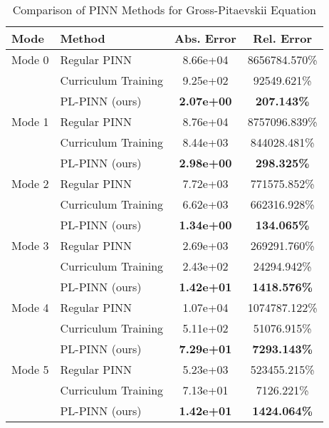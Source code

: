 \begin{table}[htbp]
\centering
\caption{Comparison of PINN Methods for Gross-Pitaevskii Equation}
\label{tab:pinn_comparison}
\begin{tabular}{llcc}
\toprule
Mode & Method & Abs. Error & Rel. Error \\
\midrule
Mode 0 & Regular PINN & 8.66e+04 & 8656784.570\% \\
 & Curriculum Training & 9.25e+02 & 92549.621\% \\
 & PL-PINN (ours) & \textbf{2.07e+00} & \textbf{207.143\%} \\
\midrule
Mode 1 & Regular PINN & 8.76e+04 & 8757096.839\% \\
 & Curriculum Training & 8.44e+03 & 844028.481\% \\
 & PL-PINN (ours) & \textbf{2.98e+00} & \textbf{298.325\%} \\
\midrule
Mode 2 & Regular PINN & 7.72e+03 & 771575.852\% \\
 & Curriculum Training & 6.62e+03 & 662316.928\% \\
 & PL-PINN (ours) & \textbf{1.34e+00} & \textbf{134.065\%} \\
\midrule
Mode 3 & Regular PINN & 2.69e+03 & 269291.760\% \\
 & Curriculum Training & 2.43e+02 & 24294.942\% \\
 & PL-PINN (ours) & \textbf{1.42e+01} & \textbf{1418.576\%} \\
\midrule
Mode 4 & Regular PINN & 1.07e+04 & 1074787.122\% \\
 & Curriculum Training & 5.11e+02 & 51076.915\% \\
 & PL-PINN (ours) & \textbf{7.29e+01} & \textbf{7293.143\%} \\
\midrule
Mode 5 & Regular PINN & 5.23e+03 & 523455.215\% \\
 & Curriculum Training & 7.13e+01 & 7126.221\% \\
 & PL-PINN (ours) & \textbf{1.42e+01} & \textbf{1424.064\%} \\
\bottomrule
\end{tabular}
\end{table}